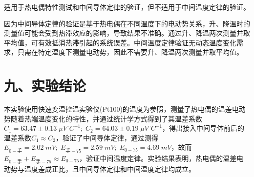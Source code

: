 \documentclass[11pt]{article}
\begin{document}
适用于热电偶特性测试和中间导体定律的验证，但不适用于中间温度定律的验证。

因为中间导体定律的验证是基于热电偶在不同温度下的电动势关系，升、降温时的测量值可能会受到热滞效应的影响，导致结果不准确。通过升、降温两次测量并取平均值，可有效抵消热滞引起的系统误差。中间温度定律验证无动态温度变化需求，只需在特定温度下测量电动势，因此不需要升、降温两次测量并取平均值。

\section*{九、实验结论}

本实验使用快速变温控温实验仪(Pt100)的温度为参照，测量了热电偶的温差电动势随着热端温度变化的特性，并通过统计学方式得到了其温差系数$C_1=63.47\pm0.13\;\mu V^{\circ}C^{-1};\;C_2=64.03\pm0.19\;\mu V^{\circ}C^{-1}$，得出接入中间导体前后的温差系数$C_1\approx C_2$，验证了中间导体定律，通过测得$E_{0-\text{手}}=2.02\;mV;\;E_{\text{手}-75}=2.59\;mV;\;E_{0-75}=4.69\;mV$，故而$E_{0-\text{手}}+E_{\text{手}-75}\approx E_{0-75}$，验证中间温度定律。实验结果表明，热电偶的温差电动势与温度差成正比，且中间导体定律和中间温度定律均成立。
\end{document}
